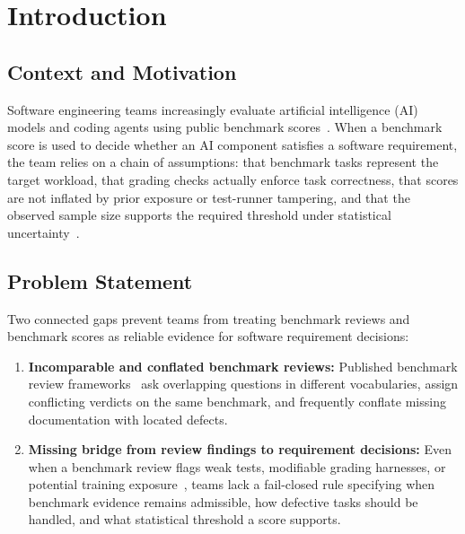 \chapter{Introduction}
\label{ch:introduction}

\section{Context and Motivation}
\label{sec:intro_motivation}

Software engineering teams increasingly evaluate artificial intelligence (AI) models and coding agents using public benchmark scores~\cite{jimenez_swebench_2024,hu_se_benchmarks_2025}. When a benchmark score is used to decide whether an AI component satisfies a software requirement, the team relies on a chain of assumptions: that benchmark tasks represent the target workload, that grading checks actually enforce task correctness, that scores are not inflated by prior exposure or test-runner tampering, and that the observed sample size supports the required threshold under statistical uncertainty~\cite{reuel_betterbench,miller_error_bars_2024}.


\section{Problem Statement}
\label{sec:intro_problem}

Two connected gaps prevent teams from treating benchmark reviews and benchmark scores as reliable evidence for software requirement decisions:
\begin{enumerate}
    \item \textbf{Incomparable and conflated benchmark reviews:} Published benchmark review frameworks~\cite{reuel_betterbench,liu_ecbd_2024,san_joaquin_scorecard_2026,cao_how2bench_2025,zhu_agentic_benchmark_checklist_2025,corona_benchmark_caliper_2026,cohn_hernandez_orallo_oecd_2023} ask overlapping questions in different vocabularies, assign conflicting verdicts on the same benchmark, and frequently conflate missing documentation with located defects.
    \item \textbf{Missing bridge from review findings to requirement decisions:} Even when a benchmark review flags weak tests, modifiable grading harnesses, or potential training exposure~\cite{yu_utboost_2025,wang_solved_issues_2026,openai_swebench_audit_2026}, teams lack a fail-closed rule specifying when benchmark evidence remains admissible, how defective tasks should be handled, and what statistical threshold a score supports.
\end{enumerate}

